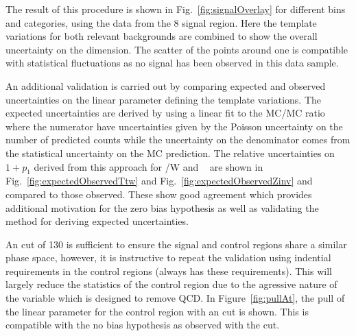 The result of this procedure is shown in Fig.~\ref{fig:signalOverlay} for different 
\scalht bins and categories, using the data from the 8 \TeV signal region. 
Here the template variations for both relevant backgrounds are combined to show 
the overall uncertainty on the \mht dimension. The scatter of the points around 
one is compatible with statistical fluctuations
as no signal has been observed in this data sample.

An additional validation is carried out by comparing expected and observed uncertainties
on the linear parameter defining the template variations.
The expected uncertainties are derived by using a linear fit to the MC/MC ratio where the numerator
have uncertainties given by the Poisson uncertainty on the number of predicted counts while
the uncertainty on the denominator comes from the statistical uncertainty on the
MC prediction. The relative uncertainties on $1+p_1$ derived from this approach 
for \ttbar/W and \zInv~ are shown in Fig.~\ref{fig:expectedObservedTtw} 
and Fig.~\ref{fig:expectedObservedZinv} and compared to those observed.
These show good agreement which provides additional motivation for the 
zero bias hypothesis as well as validating the method for deriving expected uncertainties.

An \mht cut of 130 \GeV is sufficient to ensure the 
signal and control regions share a similar phase space, however,
it is instructive to repeat the validation using indential \alt 
requirements in the control regions (\gj always has these requirements).
This will largely reduce the statistics of the control 
region due to the agressive nature of the \alt variable which is designed to remove QCD. 
In Figure~\ref{fig:pullAt}, the pull of the linear parameter for the \mj control region
with an \alt cut is shown. This is compatible with the no bias hypothesis as
observed with the \mht cut.


